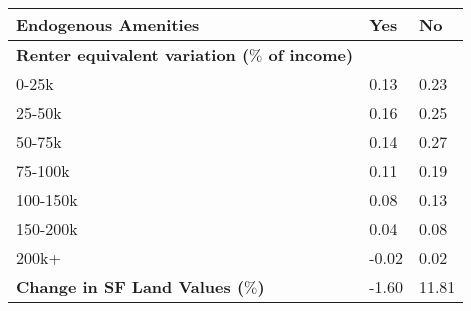 \centering \renewcommand*{\arraystretch}{1.6}
\begin{tabular}{lll}
\hline
\hline
Endogenous Amenities & Yes & No \\ 
\hline
\textbf{Renter equivalent variation ($\%$ of income)} & & \\
0-25k & 0.13 & 0.23 \\ 
25-50k & 0.16 & 0.25 \\ 
50-75k & 0.14 & 0.27 \\ 
75-100k & 0.11 & 0.19 \\ 
100-150k & 0.08 & 0.13 \\ 
150-200k & 0.04 & 0.08 \\ 
200k+ & -0.02 &  0.02 \\ 
\textbf{Change in SF Land Values ($\%$)} & -1.60 & 11.81\\ 
\hline
\hline
\end{tabular}


